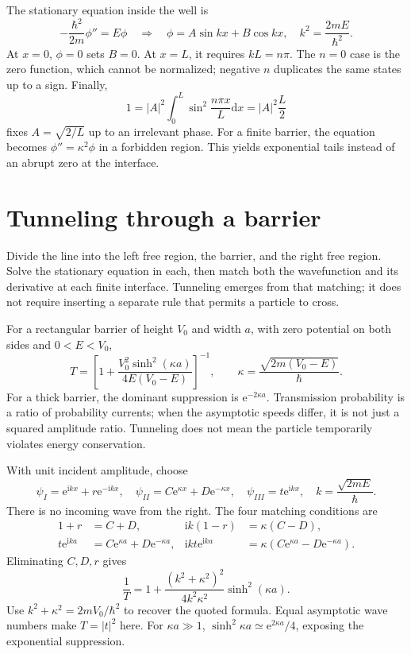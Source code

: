 \documentclass[11pt,oneside]{book}
\newcommand{\dd}{\mathrm{d}}
\newcommand{\ii}{\mathrm{i}}
\newcommand{\ee}{\mathrm{e}}
\theoremstyle{reviewstyle}
\begin{document}
The stationary equation inside the well is
\begin{equation}
-\frac{\hbar^2}{2m}\phi''=E\phi
\quad\Longrightarrow\quad \phi=A\sin kx+B\cos kx,
\quad k^2=\frac{2mE}{\hbar^2}.
\end{equation}
At $x=0$, $\phi=0$ sets $B=0$. At $x=L$, it requires $kL=n\pi$. The $n=0$ case is the zero function, which cannot be normalized; negative $n$ duplicates the same states up to a sign. Finally,
\begin{equation}
1=|A|^2\int_0^L\sin^2\frac{n\pi x}{L}\dd x
=|A|^2\frac L2
\end{equation}
fixes $A=\sqrt{2/L}$ up to an irrelevant phase. For a finite barrier, the equation becomes $\phi''=\kappa^2\phi$ in a forbidden region. This yields exponential tails instead of an abrupt zero at the interface.

\section{Tunneling through a barrier}
Divide the line into the left free region, the barrier, and the right free region. Solve the stationary equation in each, then match both the wavefunction and its derivative at each finite interface. Tunneling emerges from that matching; it does not require inserting a separate rule that permits a particle to cross.

For a rectangular barrier of height $V_0$ and width $a$, with zero potential on both sides and $0<E<V_0$,
\begin{equation}T=\left[1+\frac{V_0^2\sinh^2(\kappa a)}{4E(V_0-E)}\right]^{-1},\qquad \kappa=\frac{\sqrt{2m(V_0-E)}}\hbar.\end{equation}
For a thick barrier, the dominant suppression is $\ee^{-2\kappa a}$. Transmission probability is a ratio of probability currents; when the asymptotic speeds differ, it is not just a squared amplitude ratio. Tunneling does not mean the particle temporarily violates energy conservation.

With unit incident amplitude, choose
\begin{equation}
\psi_I=\ee^{\ii kx}+r\ee^{-\ii kx},\quad
\psi_{II}=C\ee^{\kappa x}+D\ee^{-\kappa x},\quad
\psi_{III}=t\ee^{\ii kx},\quad k=\frac{\sqrt{2mE}}\hbar.
\end{equation}
There is no incoming wave from the right. The four matching conditions are
\begin{align}
1+r&=C+D,&\ii k(1-r)&=\kappa(C-D),\\
t\ee^{\ii ka}&=C\ee^{\kappa a}+D\ee^{-\kappa a},&
\ii kt\ee^{\ii ka}&=\kappa(C\ee^{\kappa a}-D\ee^{-\kappa a}).
\end{align}
Eliminating $C,D,r$ gives
\begin{equation}
\frac1T=1+\frac{(k^2+\kappa^2)^2}{4k^2\kappa^2}\sinh^2(\kappa a).
\end{equation}
Use $k^2+\kappa^2=2mV_0/\hbar^2$ to recover the quoted formula. Equal asymptotic wave numbers make $T=|t|^2$ here. For $\kappa a\gg1$, $\sinh^2\kappa a\simeq\ee^{2\kappa a}/4$, exposing the exponential suppression.
\end{document}
